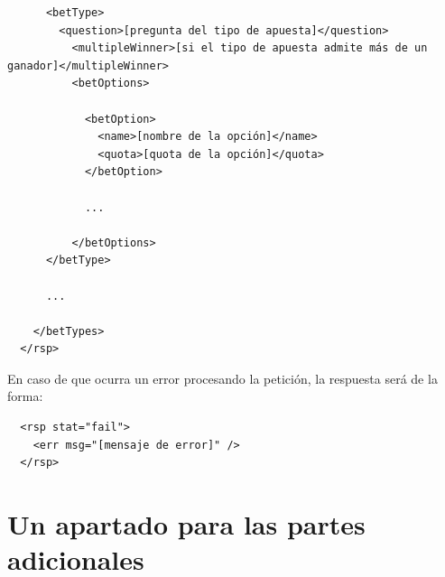 \documentclass[a4paper,twoside]{article}
\begin{document}
\begin{description}
\begin{verbatim}
      <betType>
        <question>[pregunta del tipo de apuesta]</question>
          <multipleWinner>[si el tipo de apuesta admite más de un ganador]</multipleWinner>
          <betOptions>

            <betOption>
              <name>[nombre de la opción]</name>
              <quota>[quota de la opción]</quota>
            </betOption>

            ...

          </betOptions>
      </betType>

      ...

    </betTypes>
  </rsp>
\end{verbatim}

En caso de que ocurra un error procesando la petición, la respuesta será de la forma:

\begin{verbatim}
  <rsp stat="fail">
    <err msg="[mensaje de error]" />
  </rsp>
\end{verbatim}


\end{description}



\section{Un apartado para las partes adicionales}
\end{document}
